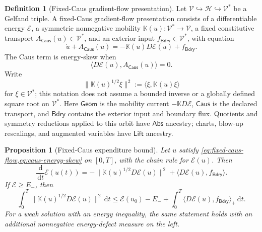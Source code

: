 \documentclass[11pt]{article}
\numberwithin{section}{part}
\theoremstyle{plain}
\newtheorem{proposition}[proposition]{Proposition}
\theoremstyle{definition}
\newtheorem{definition}[definition]{Definition}
\theoremstyle{remark}
\newcommand{\dd}{\,\mathrm d}
\newcommand{\Geom}{\mathsf{Geom}}
\newcommand{\Caus}{\mathsf{Caus}}
\newcommand{\Abs}{\mathsf{Abs}}
\newcommand{\Lift}{\mathsf{Lift}}
\newcommand{\Bdry}{\mathsf{Bdry}}
\newcommand{\Energy}{\mathcal E}
\newcommand{\Hspace}{\mathcal H}
\newcommand{\Vspace}{\mathcal V}
\begin{document}
\begin{definition}[Fixed-Caus gradient-flow presentation]
\label{def:fixed-caus-presentation}
Let
\(\Vspace\hookrightarrow\Hspace\hookrightarrow\Vspace^*\) be a Gelfand
triple.  A fixed-Caus gradient-flow presentation consists of a differentiable
energy \(\Energy\), a symmetric nonnegative mobility
\(\mathbb K(u):\Vspace^*\to\Vspace\), a fixed constitutive transport
\(A_{\Caus}(u)\in\Vspace^*\), and an exterior input
\(f_{\Bdry}\in\Vspace^*\), with equation
\begin{equation}
 \label{eq:fixed-caus-flow}
 \dot u+A_{\Caus}(u)
 =-\mathbb K(u)D\Energy(u)+f_{\Bdry}.
\end{equation}
The Caus term is energy-skew when
\begin{equation}
 \label{eq:caus-energy-skew}
 \langle D\Energy(u),A_{\Caus}(u)\rangle=0.
\end{equation}
Write
\[
 \bigl\|\mathbb K(u)^{1/2}\xi\bigr\|^2
 :=\langle \xi,\mathbb K(u)\xi\rangle
\]
for \(\xi\in\Vspace^*\); this notation does not assume a bounded inverse or
a globally defined square root on \(\Vspace^*\).
Here \(\Geom\) is the mobility current
\(-\mathbb K D\Energy\), \(\Caus\) is the declared transport,
and \(\Bdry\) contains the exterior input and boundary flux.  Quotients and
symmetry reductions applied to this orbit have \(\Abs\) ancestry; charts,
blow-up rescalings, and augmented variables have \(\Lift\) ancestry.
\end{definition}

\begin{proposition}[Fixed-Caus expenditure bound]
\label{prop:fixed-caus-expenditure-bound}
Let \(u\) satisfy \cref{eq:fixed-caus-flow,eq:caus-energy-skew} on
\([0,T]\), with the chain rule for \(\Energy(u)\).  Then
\begin{equation}
 \label{eq:fixed-caus-energy-identity}
 \frac{\dd}{\dd t}\Energy(u(t))
 =-\bigl\|\mathbb K(u)^{1/2}D\Energy(u)\bigr\|^2
  +\langle D\Energy(u),f_{\Bdry}\rangle.
\end{equation}
If \(\Energy\ge E_-\), then
\begin{equation}
 \label{eq:fixed-caus-action-bound}
 \int_0^T
 \bigl\|\mathbb K(u)^{1/2}D\Energy(u)\bigr\|^2\dd t
 \le
 \Energy(u_0)-E_-
 +\int_0^T\langle D\Energy(u),f_{\Bdry}\rangle_+\dd t.
\end{equation}
For a weak solution with an energy inequality, the same statement holds with
an additional nonnegative energy-defect measure on the left.
\end{proposition}
\end{document}
